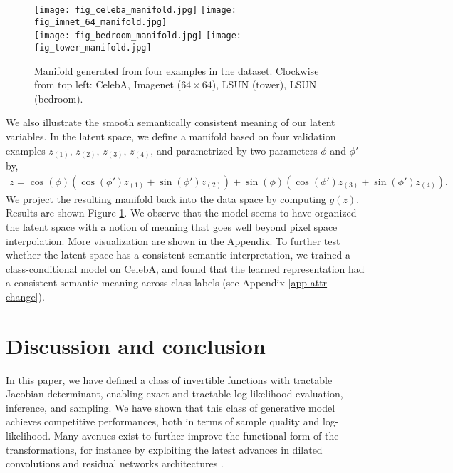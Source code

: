 \documentclass{article}
\begin{document}
\begin{figure}
\begin{center}
    \texttt{[image: fig\_celeba\_manifold.jpg]} \hfill
    \texttt{[image: fig\_imnet\_64\_manifold.jpg]} \\\vspace{1mm}
    \texttt{[image: fig\_bedroom\_manifold.jpg]} \hfill
    \texttt{[image: fig\_tower\_manifold.jpg]}
\end{center}
    \caption{Manifold generated from four examples in the dataset. Clockwise from top left: CelebA, Imagenet ($64 \times 64$), LSUN (tower), LSUN (bedroom).}
    \label{fig:manifold}
\end{figure}

We also illustrate the smooth semantically consistent meaning of our latent variables.
In the latent space, we define a manifold based on four validation examples $z_{(1)}$, $z_{(2)}$, $z_{(3)}$, $z_{(4)}$, and parametrized by two parameters $\phi$ and $\phi'$ by,
\begin{align}
z = \cos(\phi) \left(\cos(\phi') z_{(1)} + \sin(\phi') z_{(2)}\right) + \sin(\phi) \left(\cos(\phi') z_{(3)} + \sin(\phi') z_{(4)}\right)
.
\label{eq:manifold}
\end{align}
We project the resulting manifold back into the data space by computing $g(z)$. Results are shown Figure \ref{fig:manifold}. We observe that the model seems to have organized the latent space with a notion of meaning that goes well beyond pixel space interpolation. More visualization are shown in the Appendix. To further test whether the latent space has a consistent semantic interpretation, we trained a class-conditional model on CelebA, and found that the learned representation had a consistent semantic meaning across class labels (see Appendix \ref{app attr change}).









\section{Discussion and conclusion}
In this paper, we have defined a class of invertible functions with tractable Jacobian determinant, enabling exact and tractable log-likelihood evaluation, inference, and sampling.
We have shown that this class of generative model achieves competitive performances, both in terms of sample quality and log-likelihood.
Many avenues exist to further improve the functional form of the transformations, for instance by exploiting the latest advances in dilated convolutions \citep{yu2015multi} and residual networks architectures \citep{DBLP:journals/corr/TargAL16}.
\end{document}
